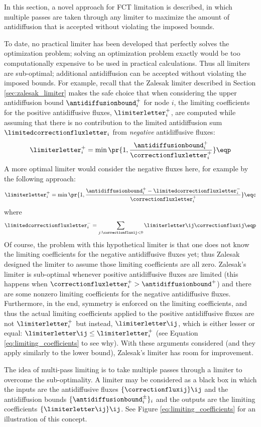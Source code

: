 In this section, a novel approach for FCT limitation is described, in which
multiple passes are taken through any limiter to maximize the amount of
antidiffusion that is accepted without violating the imposed bounds.

To date, no practical limiter has been developed that perfectly solves
the optimization problem; solving an optimization problem exactly would
be too computationally expensive to be used in practical calculations.
Thus all limiters are sub-optimal; additional antidiffusion can be accepted
without violating the imposed bounds. For example, recall that the Zalesak
limiter described in Section \ref{sec:zalesak_limiter} makes the safe
choice that when considering the upper antidiffusion bound
$\antidiffusionbound_i^+$ for node $i$, the limiting coefficients
for the positive antidiffusive fluxes, $\limiterletter_i^+$, are computed
while assuming that there is no contribution to the limited antidiffusion sum
$\limitedcorrectionfluxletter_i$ from \emph{negative} antidiffusive fluxes:
\[
  \limiterletter_i^+ = \min\pr{1,\frac{\antidiffusionbound_i^+}
    {\correctionfluxletter_i^+}} \eqp
\]
A more optimal limiter would consider the negative fluxes here, for example
by the following approach:
\[
  \limiterletter_i^+ = \min\pr{1,\frac{\antidiffusionbound_i^+
    - \limitedcorrectionfluxletter_i^-}
    {\correctionfluxletter_i^+}} \eqc
\]
where
\[
  \limitedcorrectionfluxletter_i^- = \sum\limits_{j:\correctionfluxij<0}
    \limiterletter\ij\correctionfluxij \eqp
\]
Of course, the problem with this hypothetical limiter is that one does not
know the limiting coefficients for the negative antidiffusive fluxes yet;
thus Zalesak designed the limiter to assume those limiting coefficients
are all zero. Zalesak's limiter is sub-optimal whenever
positive antidiffusive fluxes are limited
(this happens when $\correctionfluxletter_i^+ > \antidiffusionbound^+$)
and there are some nonzero limiting coefficients for the negative antidiffusive
fluxes. Furthermore, in the end, symmetry is enforced on the limiting
coefficients, and thus the actual limiting coefficients applied to the
positive antidiffusive fluxes are not $\limiterletter_i^+$ but instead,
$\limiterletter\ij$, which is either lesser or equal:
$\limiterletter\ij \leq\limiterletter_i^+$ (see Equation
\eqref{eq:limiting_coefficients} to see why). With these arguments considered
(and they apply similarly to the lower bound), Zalesak's limiter has
room for improvement.

The idea of multi-pass limiting is to take multiple passes through a
limiter to overcome the sub-optimality.
A limiter may be considered as a black box in which the inputs are the
antidiffusive fluxes $\{\correctionfluxij\}\ij$ and the antidiffusion bounds
$\{\antidiffusionbound_i^\pm\}_i$ and the outputs are the limiting coefficients
$\{\limiterletter\ij\}\ij$. See Figure \ref{eq:limiting_coefficients} for
an illustration of this concept.

